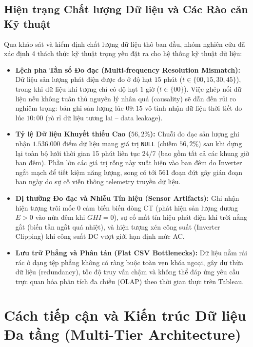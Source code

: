 \documentclass[12pt, a4paper]{report}
\begin{document}
\subsection{Hiện trạng Chất lượng Dữ liệu và Các Rào cản Kỹ thuật}

Qua khảo sát và kiểm định chất lượng dữ liệu thô ban đầu, nhóm nghiên cứu đã xác định 4 thách thức kỹ thuật trọng yếu đặt ra cho hệ thống kỹ thuật dữ liệu:

\begin{itemize}[leftmargin=*]
    \item \textbf{Lệch pha Tần số Đo đạc (Multi-frequency Resolution Mismatch):} Dữ liệu sản lượng phát điện được đo ở độ hạt $15$ phút ($t \in \{00, 15, 30, 45\}$), trong khi dữ liệu khí tượng chỉ có độ hạt $1$ giờ ($t \in \{00\}$). Việc ghép nối dữ liệu nếu không tuân thủ nguyên lý nhân quả (causality) sẽ dẫn đến rủi ro nghiêm trọng: bản ghi sản lượng lúc $09:15$ vô tình nhận dữ liệu thời tiết đo lúc $10:00$ (rò rỉ dữ liệu tương lai -- data leakage).
    
    \item \textbf{Tỷ lệ Dữ liệu Khuyết thiếu Cao ($56{,}2\%$):} Chuỗi đo đạc sản lượng ghi nhận $1.536.000$ điểm dữ liệu mang giá trị \texttt{NULL} (chiếm $56{,}2\%$) sau khi dựng lại toàn bộ lưới thời gian 15 phút liên tục 24/7 (bao gồm tất cả các khung giờ ban đêm). Phần lớn các giá trị rỗng này xuất hiện vào ban đêm do Inverter ngắt mạch để tiết kiệm năng lượng, song có tới 561 đoạn đứt gãy gián đoạn ban ngày do sự cố viễn thông telemetry truyền dữ liệu.
    
    \item \textbf{Dị thường Đo đạc và Nhiễu Tín hiệu (Sensor Artifacts):} Ghi nhận hiện tượng trôi mốc 0 cảm biến biến dòng CT (phát hiện sản lượng dương $E > 0$ vào nửa đêm khi $GHI = 0$), sự cố mất tín hiệu phát điện khi trời nắng gắt (biến tần ngắt quá nhiệt), và hiện tượng xén công suất (Inverter Clipping) khi công suất DC vượt giới hạn định mức AC.
    
    \item \textbf{Lưu trữ Phẳng và Phân tán (Flat CSV Bottlenecks):} Dữ liệu nằm rải rác ở dạng tệp phẳng không có ràng buộc toàn vẹn khóa ngoại, gây dư thừa dữ liệu (redundancy), tốc độ truy vấn chậm và không thể đáp ứng yêu cầu trực quan hóa phân tích đa chiều (OLAP) theo thời gian thực trên Tableau.
\end{itemize}

\section{Cách tiếp cận và Kiến trúc Dữ liệu Đa tầng (Multi-Tier Architecture)}
\label{sec:multi_tier_arch}
\end{document}
